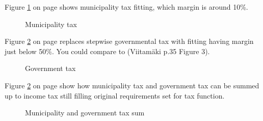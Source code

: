 Figure \ref{fig:muntax} on page \pageref{fig:muntax}
shows municipality tax fitting, which margin is around 10\%. 
\begin{figure} %
 \begin{center}
  \caption{Municipality tax}
  \label{fig:muntax}
 \end{center}
\end{figure}
Figure \ref{fig:govtax} on page \pageref{fig:govtax}
replaces stepwise governmental tax with fitting having margin just below 50\%.
You could compare to (Viitam\"aki\cite{VM_46_2019} p.35 Figure 3).
\begin{figure} %
 \begin{center}
  \caption{Government tax}
  \label{fig:govtax}
 \end{center}
\end{figure}
Figure \ref{fig:govtax} on page \pageref{fig:govtax}
show how municipality tax and government tax can be summed up to income tax
still filling original requirements set for tax function.
\begin{figure} %
 \begin{center}
  \caption{Municipality and government tax sum}
  \label{fig:sumtax}
 \end{center}
\end{figure}

